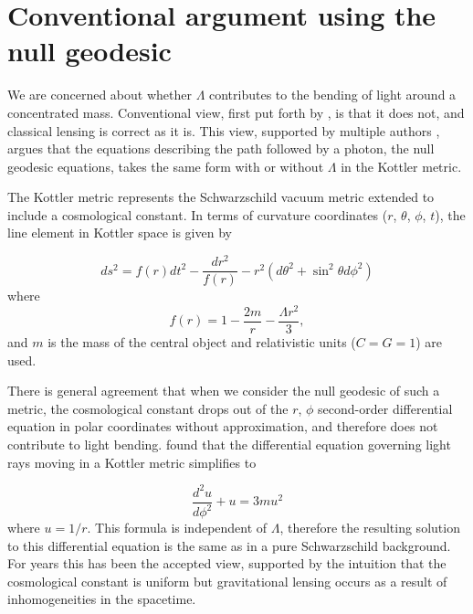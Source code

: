 \section{Conventional argument using the null geodesic}\label{section:conventional}

We are concerned about whether $\Lambda$ contributes to the bending of light around a concentrated mass. Conventional view, first put forth by \citet{Islam1983}, is that it does not, and classical lensing is correct as it is. This view, supported by multiple authors \citep{Lake2002,Finelli2007,Park2008,Simpson2008}, argues that the equations describing the path followed by a photon, the null geodesic equations, takes the same form with or without $\Lambda$ in the Kottler metric. 

The Kottler metric \citep{Kottler1918} represents the Schwarzschild vacuum metric extended to include a cosmological constant. In terms of curvature coordinates ($r$, $\theta$, $\phi$, $t$), the line element in Kottler space is given by

\begin{equation}
  ds^2 = f(r) dt^2 - \frac{dr^2}{f(r)} - r^2 (d \theta^2 + \sin^2 \theta d \phi^2)
  \label{eq:kottler-metric}
\end{equation} 
where 
\begin{equation}
  f(r) = 1 - \frac{2m}{r} - \frac{\Lambda r^2}{3},
  \label{eq:kottler-metric2}
\end{equation}
and $m$ is the mass of the central object and relativistic units ($C = G = 1$) are used. 

There is general agreement \citep{Lake2002,Rindler2007} that when we consider the null geodesic of such a metric, the cosmological constant drops out of the $r$, $\phi$ second-order differential equation in polar coordinates without approximation, and therefore does not contribute to light bending. \citet{Islam1983} found that the differential equation governing light rays moving in a Kottler metric simplifies to

\begin{equation}
  \frac{d^2 u}{d \phi^2} + u = 3mu^2
  \label{eq:null-geodesic-kottler}
\end{equation}
where $u = 1/r$. This formula is independent of $\Lambda$, therefore the resulting solution to this differential equation is the same as in a pure Schwarzschild background. For years this has been the accepted view, supported by the intuition that the cosmological constant is uniform but gravitational lensing occurs as a result of inhomogeneities in the spacetime. 


